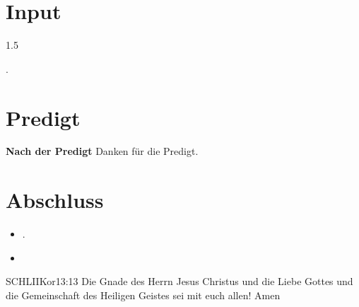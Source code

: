 \documentclass[fontsize=14pt]{mybib}
\begin{document}
\section{ Input }
\begin{spacing}{1.5}
    
    .
\end{spacing}
\section{Predigt}
\textbf{Nach der Predigt}\newline
Danken für die Predigt.
\section{Abschluss}
\begin{itemize}
    \item [] .
    \item [] 
\end{itemize}
\begin{bibelbox}{SCHL}{IIKor}{13:13}
    Die Gnade des Herrn Jesus Christus und die Liebe Gottes und die Gemeinschaft des Heiligen Geistes sei mit euch allen! Amen
\end{bibelbox}
\end{document}

